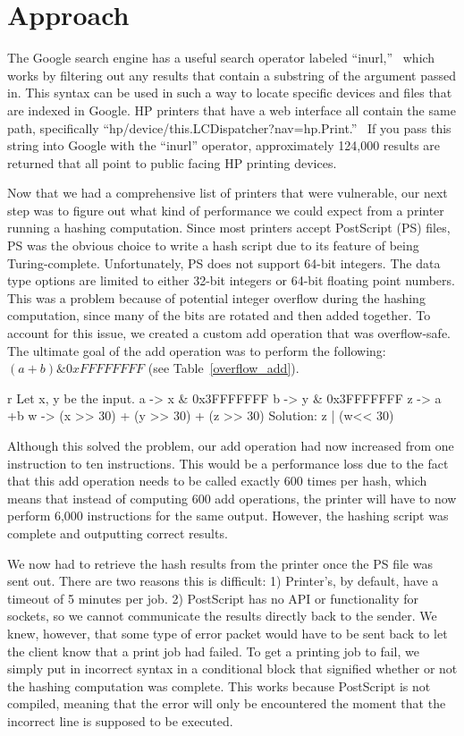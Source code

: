 \section{Approach}

The Google search engine has a useful search operator labeled “inurl,”  which works by filtering out any results that contain a substring of the argument passed in.
This syntax can be used in such a way to locate specific devices and files that are indexed in Google.
HP printers that have a web interface all contain the same path, specifically “hp/device/this.LCDispatcher?nav=hp.Print.”  If you pass this string into Google with the “inurl” operator, approximately 124,000 results are returned that all point to public facing HP printing devices.

Now that we had a comprehensive list of printers that were vulnerable, our next step was to figure out what kind of performance we could expect from a printer running a hashing computation.
Since most printers accept PostScript (PS) files, PS was the obvious choice to write a hash script due to its feature of being Turing-complete.
Unfortunately, PS does not support 64-bit integers.
The data type options are limited to either 32-bit integers or 64-bit floating point numbers.
This was a problem because of potential integer overflow during the hashing computation, since many of the bits are rotated and then added together.
To account for this issue, we created a custom add operation that was overflow-safe.
The ultimate goal of the add operation was to perform the following: $(a + b) \& 0xFFFFFFFF$ (see Table~\ref{overflow_add}).

\begin{table}
\label{overflow_add}
\begin{tabular}{r}
Let x, y be the input.
a -> x & 0x3FFFFFFF
b -> y & 0x3FFFFFFF
z -> a +b
w -> (x >> 30) + (y >> 30) + (z >> 30)
Solution: z | (w<< 30)
\end{tabular}
\end{table}

Although this solved the problem, our add operation had now increased from one instruction to ten instructions.
This would be a performance loss due to the fact that this add operation needs to be called exactly 600 times per hash, which means that instead of computing 600 add operations, the printer will have to now perform 6,000 instructions for the same output.
However, the hashing script was complete and outputting correct results.

We now had to retrieve the hash results from the printer once the PS file was sent out.
There are two reasons this is difficult: 1) Printer’s, by default, have a timeout of 5 minutes per job.
2) PostScript has no API or functionality for sockets, so we cannot communicate the results directly back to the sender.
We knew, however, that some type of error packet would have to be sent back to let the client know that a print job had failed.
To get a printing job to fail, we simply put in incorrect syntax in a conditional block that signified whether or not the hashing computation was complete.
This works because PostScript is not compiled, meaning that the error will only be encountered the moment that the incorrect line is supposed to be executed.

